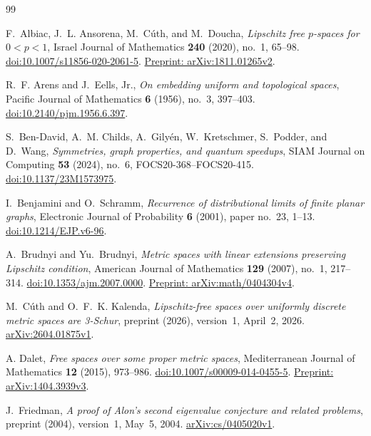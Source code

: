 \begin{thebibliography}{99}

F.~Albiac, J.~L. Ansorena, M.~C\'uth, and M.~Doucha,
\emph{Lipschitz free $p$-spaces for $0<p<1$},
Israel Journal of Mathematics \textbf{240} (2020), no.~1, 65--98.
\href{https://doi.org/10.1007/s11856-020-2061-5}{doi:10.1007/s11856-020-2061-5}.
\href{https://arxiv.org/abs/1811.01265v2}{Preprint: arXiv:1811.01265v2}.

R.~F. Arens and J.~Eells, Jr.,
\emph{On embedding uniform and topological spaces},
Pacific Journal of Mathematics \textbf{6} (1956), no.~3, 397--403.
\href{https://doi.org/10.2140/pjm.1956.6.397}{doi:10.2140/pjm.1956.6.397}.

S.~Ben-David, A.~M. Childs, A.~Gily\'en, W.~Kretschmer, S.~Podder, and D.~Wang,
\emph{Symmetries, graph properties, and quantum speedups},
SIAM Journal on Computing \textbf{53} (2024), no.~6,
FOCS20-368--FOCS20-415.
\href{https://doi.org/10.1137/23M1573975}{doi:10.1137/23M1573975}.

I.~Benjamini and O.~Schramm,
\emph{Recurrence of distributional limits of finite planar graphs},
Electronic Journal of Probability \textbf{6} (2001), paper no.~23, 1--13.
\href{https://doi.org/10.1214/EJP.v6-96}{doi:10.1214/EJP.v6-96}.

A.~Brudnyi and Yu.~Brudnyi,
\emph{Metric spaces with linear extensions preserving Lipschitz condition},
American Journal of Mathematics \textbf{129} (2007), no.~1, 217--314.
\href{https://doi.org/10.1353/ajm.2007.0000}{doi:10.1353/ajm.2007.0000}.
\href{https://arxiv.org/abs/math/0404304v4}{Preprint: arXiv:math/0404304v4}.

M.~C\'uth and O.~F.~K. Kalenda,
\emph{Lipschitz-free spaces over uniformly discrete metric spaces are
3-Schur}, preprint (2026), version~1, April~2, 2026.
\href{https://arxiv.org/abs/2604.01875v1}{arXiv:2604.01875v1}.

A. Dalet,
\emph{Free spaces over some proper metric spaces},
Mediterranean Journal of Mathematics \textbf{12} (2015), 973--986.
\href{https://doi.org/10.1007/s00009-014-0455-5}{doi:10.1007/s00009-014-0455-5}.
\href{https://arxiv.org/abs/1404.3939v3}{Preprint: arXiv:1404.3939v3}.

J.~Friedman,
\emph{A proof of Alon's second eigenvalue conjecture and related problems},
preprint (2004), version~1, May~5, 2004.
\href{https://arxiv.org/abs/cs/0405020v1}{arXiv:cs/0405020v1}.


\end{thebibliography}
